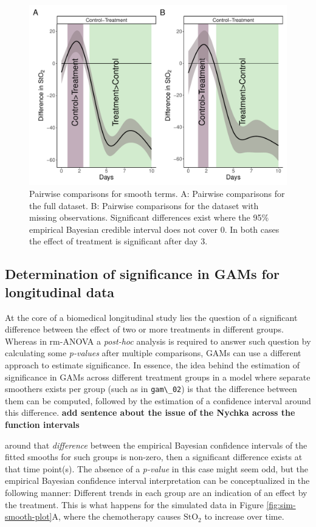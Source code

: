 \documentclass[
]{article}
\newcommand{\passthrough}[1]{#1}
\begin{document}
\begin{figure}

{\centering \includegraphics[width=0.75\linewidth]{SIM_Appendix_files/figure-latex/plot-pairwise-comp-1} 

}

\caption{Pairwise comparisons for smooth terms. A: Pairwise comparisons for the full dataset. B: Pairwise comparisons for the dataset with missing observations. Significant differences exist where the 95\% empirical Bayesian credible interval does not cover 0. In both cases the effect of treatment is significant after day 3.}\label{fig:plot-pairwise-comp}
\end{figure}

\hypertarget{GAM-significance}{%
\subsection{Determination of significance in GAMs for longitudinal data}\label{GAM-significance}}

At the core of a biomedical longitudinal study lies the question of a significant difference between the effect of two or more treatments in different groups. Whereas in rm-ANOVA a \emph{post-hoc} analysis is required to answer such question by calculating some \emph{p-values} after multiple comparisons, GAMs can use a different approach to estimate significance. In essence, the idea behind the estimation of significance in GAMs across different treatment groups in a model where separate smoothers exists per group (such as in \passthrough{\lstinline!gam\_02!}) is that the difference between them can be computed, followed by the estimation of a confidence interval around this difference.
\textbf{add sentence about the issue of the Nychka across the function intervals }

around that \emph{difference} between the empirical Bayesian confidence intervals of the fitted smooths for such groups is non-zero, then a significant difference exists at that time point(s). The absence of a \emph{p-value} in this case might seem odd, but the empirical Bayesian confidence interval interpretation can be conceptualized in the following manner: Different trends in each group are an indication of an effect by the treatment. This is what happens for the simulated data in Figure \ref{fig:sim-smooth-plot}A, where the chemotherapy causes \(\mbox{StO}_2\) to increase over time.
\end{document}
